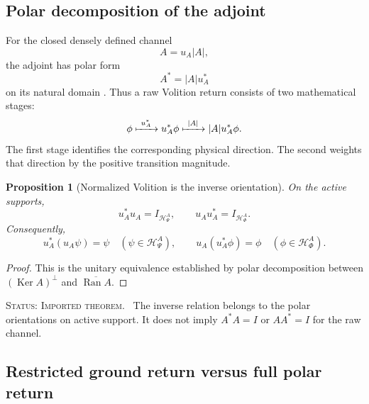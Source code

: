 \documentclass[11pt,reqno]{scrartcl}
\newcommand{\polA}{u_A}
\newcommand{\absA}{|A|}
\DeclareMathOperator{\Ran}{Ran}
\DeclareMathOperator{\Ker}{Ker}
\newcommand{\statuslabel}[1]{\par\smallskip\noindent\textsc{Status: #1.}\ }
\newcommand{\actHP}{\mathscr H_{\Psi}^{A}}
\newcommand{\actHF}{\mathscr H_{\Phi}^{A}}
\theoremstyle{plain}
\newtheorem{proposition}[proposition]{Proposition}
\theoremstyle{definition}
\theoremstyle{remark}
\begin{document}
\subsection{Polar decomposition of the adjoint}

For the closed densely defined channel
\begin{equation}
  A=\polA\absA,
\end{equation}
the adjoint has polar form
\begin{equation}
  \boxed{A^*=\absA\polA^*}
  \label{eq:adjoint-polar-form}
\end{equation}
on its natural domain \cite{Kato,ReedSimon}.  Thus a raw Volition return consists of two
mathematical stages:
\begin{equation}
  \phi
  \xmapsto{\ \polA^*\ }
  \polA^*\phi
  \xmapsto{\ \absA\ }
  \absA\polA^*\phi.
  \label{eq:volition-two-stage}
\end{equation}
The first stage identifies the corresponding physical direction.  The second
weights that direction by the positive transition magnitude.

\begin{proposition}[Normalized Volition is the inverse orientation]
\label{prop:normalized-volition-inverse}
On the active supports,
\begin{equation}
  \polA^*\polA=I_{\actHP},
  \qquad
  \polA\polA^*=I_{\actHF}.
  \label{eq:active-inverse-orientations}
\end{equation}
Consequently,
\begin{equation}
  \polA^*(\polA\psi)=\psi
  \quad(\psi\in\actHP),
  \qquad
  \polA(\polA^*\phi)=\phi
  \quad(\phi\in\actHF).
  \label{eq:active-round-trips}
\end{equation}
\end{proposition}

\begin{proof}
This is the unitary equivalence established by polar decomposition between
$(\Ker A)^\perp$ and $\overline{\Ran A}$.
\end{proof}

\statuslabel{Imported theorem} The inverse relation belongs to the polar
orientations on active support.  It does not imply $A^*A=I$ or $AA^*=I$ for
the raw channel.

\subsection{Restricted ground return versus full polar return}
\end{document}

